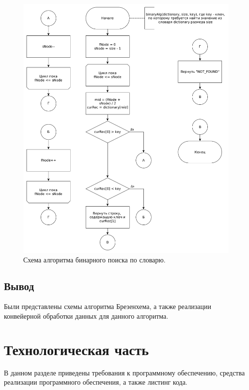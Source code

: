\documentclass[12pt]{report}
\begin{document}
\begin{figure}
\begin{center}
\includegraphics[scale=0.4]{inc/img/binAlg.png}
\captionsetup{justification=centering}
	\caption{Схема алгоритма бинарного поиска по словарю.}
	\label{img:brutAlg}	
\end{center}
\end{figure}

\newpage

\section*{Вывод}
Были представлены схемы алгоритма Брезенхема, а также реализации конвейерной обработки данных для данного алгоритма.

\chapter{Технологическая часть}
В данном разделе приведены требования к программному обеспечению, средства реализации программного обеспечения, а также листинг кода.
\end{document}
